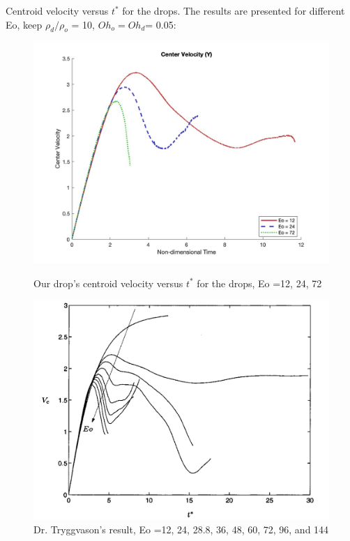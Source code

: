 \documentclass[12pt]{article}
\begin{document}
Centroid velocity versus $t^*$ for the drops. The results are presented for different Eo, keep $\rho_d/\rho_o$ = 10, $Oh_o=Oh_d$= 0.05:

\begin{figure}[H]
    \centering
    \begin{minipage}{0.45\textwidth}
        \centering
        \includegraphics[width=\textwidth]{Latex/figures/velocity_profile_compare.jpg}
        \caption{Our drop's centroid velocity versus $t^*$ for the drops, Eo =12, 24, 72}
        \label{fig:deformation1}
    \end{minipage}
    \hspace{0.05\textwidth}
    \begin{minipage}{0.45\textwidth}
        \centering
        \includegraphics[width=\textwidth]{Latex/figures/Trygg_allEo_velo.jpeg}
        \caption{Dr. Tryggvason's result, Eo =12, 24, 28.8, 36, 48, 60, 72, 96, and 144}
        \label{fig:deformation2}
    \end{minipage}
\end{figure}
\end{document}
